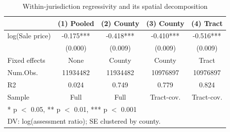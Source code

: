 \begin{table}
\centering
\caption{Within-jurisdiction regressivity and its spatial decomposition}\label{tab:decomp}
\centering
\begin{tabular}[t]{lcccc}
\toprule
  & (1) Pooled & (2) County & (3) County & (4) Tract\\
\midrule
log(Sale price) & -0.175*** & -0.418*** & -0.410*** & -0.516***\\
 & (0.000) & (0.009) & (0.009) & (0.009)\\
\midrule
Fixed effects & None & County & County & Tract\\
Num.Obs. & 11934482 & 11934482 & 10976897 & 10976897\\
R2 & 0.024 & 0.749 & 0.779 & 0.824\\
Sample & Full & Full & Tract-cov. & Tract-cov.\\
\bottomrule
\multicolumn{5}{l}{\rule{0pt}{1em}* p $<$ 0.05, ** p $<$ 0.01, *** p $<$ 0.001}\\
\multicolumn{5}{l}{\rule{0pt}{1em}DV: log(assessment ratio); SE clustered by county.}\\
\end{tabular}
\end{table}

